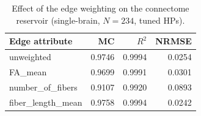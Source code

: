 \begin{table}[h]
    \centering
    \caption{Effect of the edge weighting on the connectome reservoir (single-brain, $N{=}234$, tuned HPs).}
    \label{tab:mg_edge_attr}
    \begin{tabular}{lrrr}
        \hline
        Edge attribute & MC & $R^2$ & NRMSE \\
        \hline
        unweighted & 0.9746 & 0.9994 & 0.0254 \\
        FA\_mean & 0.9699 & 0.9991 & 0.0301 \\
        number\_of\_fibers & 0.9107 & 0.9920 & 0.0893 \\
        fiber\_length\_mean & 0.9758 & 0.9994 & 0.0242 \\
        \hline
    \end{tabular}
\end{table}
